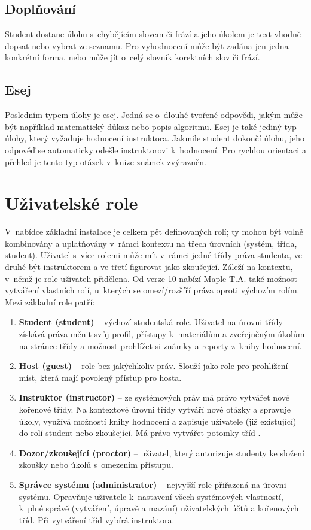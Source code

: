 \documentclass[
print,
  11pt,
  table,   
  nolof,    
  nolot,
  oneside,final
]{fithesis3}
\begin{document}
	\subsection{Doplňování}
Student dostane úlohu s~chybějícím slovem či frází a jeho úkolem je text vhodně dopsat nebo vybrat ze seznamu. Pro vyhodnocení může být zadána jen jedna konkrétní forma, nebo může jít o~celý slovník korektních slov či frází.
 
	\subsection{Esej}
Posledním typem úlohy je esej. Jedná se o~dlouhé tvořené odpovědi, jakým může být například matematický důkaz nebo popis algoritmu. Esej je také jediný typ úlohy, který vyžaduje hodnocení instruktora. Jakmile student dokončí úlohu, jeho odpověď se automaticky odešle instruktorovi k~hodnocení. Pro rychlou orientaci a přehled je tento typ otázek v~knize známek zvýrazněn.



	\section{Uživatelské role}
V~nabídce základní instalace je celkem pět definovaných rolí; ty mohou být volně kombinovány a uplatňovány v~rámci kontextu na třech úrovních (systém, třída, student). Uživatel s~více rolemi může mít v~rámci jedné třídy práva studenta, ve druhé být instruktorem a ve třetí figurovat jako zkoušející. Záleží na kontextu, v~němž je role uživateli přidělena. Od verze 10 nabízí Maple T.A. také možnost vytváření vlastních rolí, u~kterých se omezí/rozšíří práva oproti výchozím rolím. Mezi základní role patří:
\begin{enumerate}
\item \textbf{Student (student)} -- výchozí studentská role. Uživatel na úrovni třídy získává práva měnit svůj profil, přístupy k~materiálům a zveřejněným úkolům na stránce třídy a možnost prohlížet si známky a reporty z~knihy hodnocení.
\item \textbf{Host (guest)} -- role bez jakýchkoliv práv. Slouží jako role pro prohlížení míst, která mají povolený přístup pro hosta.
\item \textbf{Instruktor (instructor)} -- ze systémových práv má právo vytvářet no\-vé kořenové třídy. Na kontextové úrovni třídy vytváří nové otázky a spravuje úkoly, využívá možností knihy hodnocení a zapisuje uživatele (již existující) do rolí student nebo zkoušející. Má právo vytvářet potomky tříd .
\item \textbf{Dozor/zkoušející (proctor)} -- uživatel, který autorizuje studenty ke složení zkoušky nebo úkolů s~omezením přístupu.
\item \textbf{Správce systému (administrator)} -- nejvyšší role přiřazená na úrovni systému. Opravňuje uživatele k~nastavení všech systémových vlastností, k~plné správě (vytváření, úpravě a mazání) uživatelských účtů a kořenových tříd. Při vytváření tříd vybírá instruktora.
\end{enumerate}
\end{document}
